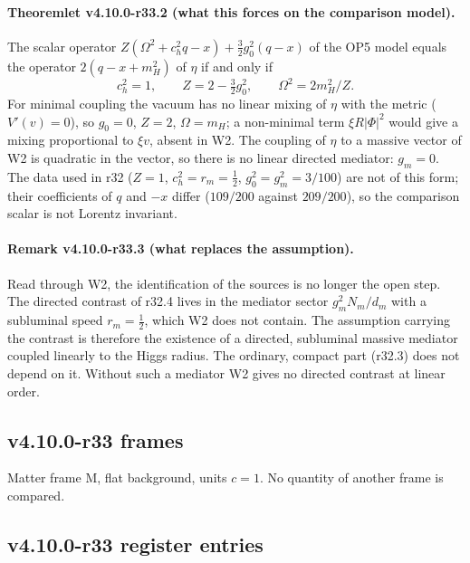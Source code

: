 \paragraph{Theoremlet v4.10.0-r33.2 (what this forces on the comparison model).}
The scalar operator \(Z(\Omega^2+c_h^2q-x)+\tfrac32g_0^2(q-x)\) of the OP5 model equals the operator \(2(q-x+m_H^2)\) of \(\eta\) if and only if
\[
 c_h^2=1,\qquad Z=2-\tfrac32g_0^2,\qquad \Omega^2=2m_H^2/Z .
\]
For minimal coupling the vacuum has no linear mixing of \(\eta\) with the metric (\(V'(v)=0\)), so \(g_0=0\), \(Z=2\), \(\Omega=m_H\); a non-minimal term
\(\xi R|\Phi|^2\) would give a mixing proportional to \(\xi v\), absent in W2.  The coupling of \(\eta\) to a massive vector of W2 is quadratic in the
vector, so there is no linear directed mediator: \(g_m=0\).  The data used in r32 (\(Z=1\), \(c_h^2=r_m=\tfrac12\), \(g_0^2=g_m^2=3/100\)) are not of this
form; their coefficients of \(q\) and \(-x\) differ (\(109/200\) against \(209/200\)), so the comparison scalar is not Lorentz invariant.

\paragraph{Remark v4.10.0-r33.3 (what replaces the assumption).}
Read through W2, the identification of the sources is no longer the open step.  The directed contrast of r32.4 lives in the mediator
sector \(g_m^2N_m/d_m\) with a subluminal speed \(r_m=\tfrac12\), which W2 does not contain.  The assumption carrying the contrast is therefore
the existence of a directed, subluminal massive mediator coupled linearly to the Higgs radius.  The ordinary, compact part (r32.3) does
not depend on it.  Without such a mediator W2 gives no directed contrast at linear order.

\subsection*{v4.10.0-r33 frames}
\label{subsec:v4100-r33-frames}

Matter frame M, flat background, units \(c=1\).  No quantity of another frame is compared.

\subsection*{v4.10.0-r33 register entries}
\label{subsec:v4100-r33-register}

